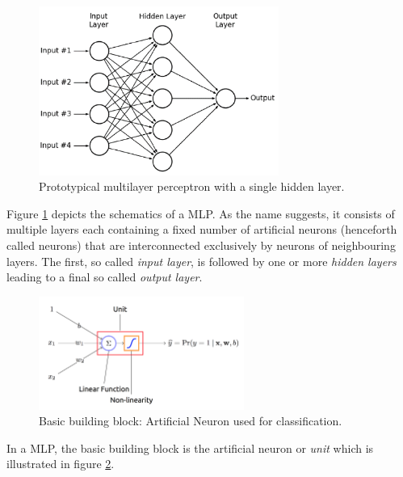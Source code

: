 \begin{figure}[H]
\centering
\includegraphics[width=0.7\textwidth]{figures/chapter-2/multilayer-perceptron.png}
\caption{Prototypical multilayer perceptron with a single hidden layer.}\label{fig:multilayer-perceptron}
\end{figure}
Figure \ref{fig:multilayer-perceptron} depicts the schematics of a MLP. As the name suggests, it consists of multiple layers each containing a fixed number of artificial neurons (henceforth called neurons) that are interconnected exclusively by neurons of neighbouring layers. The first, so called \emph{input layer}, is followed by one or more \emph{hidden layers} leading to a final so called \emph{output layer}. 

\begin{figure}[h]
	\centering
	\includegraphics[width=0.6\textwidth]{figures/chapter-2/artificial-neuron.png}
	\caption{Basic building block: Artificial Neuron used for classification.}\label{fig:artificial-neuron}   
\end{figure}

In a MLP, the basic building block is the artificial neuron or \emph{unit} which is illustrated in figure \ref{fig:artificial-neuron}. 

